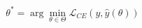 \documentclass[preview]{standalone}
\begin{document}
\begin{align*}
\theta^* = \arg\min_{\theta \in \Theta} \mathcal{L}_{CE}(y,\hat y(\theta))
\end{align*}
\end{document}
